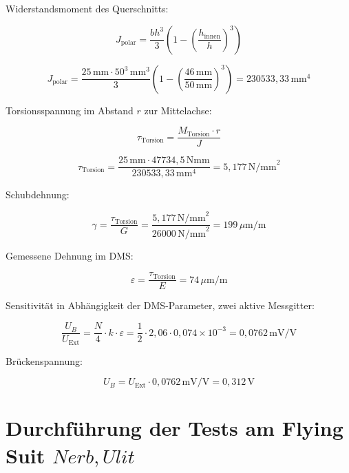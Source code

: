 Widerstandsmoment des Querschnitts:

\begin{equation}
J_{\text{polar}} = \frac{b h^3}{3} \left( 1 - \left( \frac{h_{\text{innen}}}{h} \right)^3 \right)
\end{equation}

\begin{equation}
J_{\text{polar}} = \frac{25\,\text{mm} \cdot 50^3\,\text{mm}^3}{3} \left( 1 - \left( \frac{46\,\text{mm}}{50\,\text{mm}} \right)^3 \right) = 230533,33\,\text{mm}^4
\end{equation}

Torsionsspannung im Abstand \( r \) zur Mittelachse:

\begin{equation}
\tau_{\text{Torsion}} = \frac{M_{\text{Torsion}} \cdot r}{J}
\end{equation}

\begin{equation}
\tau_{\text{Torsion}} = \frac{25\,\text{mm} \cdot 47734,5\,\text{Nmm}}{230533,33\,\text{mm}^4} = 5,177\,\text{N/mm}^2
\end{equation}

Schubdehnung:

\begin{equation}
\gamma = \frac{\tau_{\text{Torsion}}}{G} = \frac{5,177\,\text{N/mm}^2}{26000\,\text{N/mm}^2} = 199\,\mu\text{m/m}
\end{equation}

Gemessene Dehnung im DMS:

\begin{equation}
\varepsilon = \frac{\tau_{\text{Torsion}}}{E} = 74\,\mu\text{m/m}
\end{equation}

Sensitivität in Abhängigkeit der DMS-Parameter, zwei aktive Messgitter:

\begin{equation}
\frac{U_B}{U_{\text{Ext}}} = \frac{N}{4} \cdot k \cdot \varepsilon = \frac{1}{2} \cdot 2,06 \cdot 0,074 \times 10^{-3} = 0,0762\,\text{mV/V}
\end{equation}

Brückenspannung:

\begin{equation}
U_B = U_{\text{Ext}} \cdot 0,0762\,\text{mV/V} = 0,312\,\text{V}
\end{equation}



\section{Durchführung der Tests am Flying Suit \(Nerb, Ulit\)}
